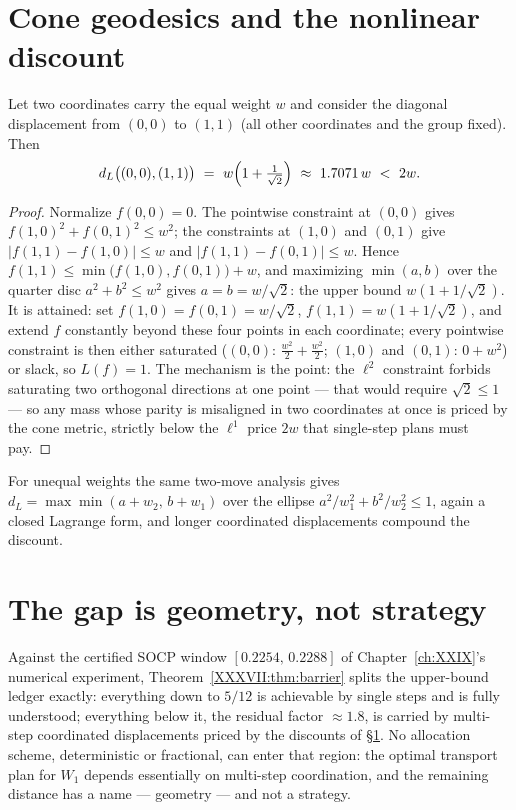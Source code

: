 \section{Cone geodesics and the nonlinear discount}\label{XXXVII:sec:geodesic}

\begin{theorem}\label{XXXVII:thm:diag}
Let two coordinates carry the equal weight $w$ and consider the diagonal displacement
from $(0,0)$ to $(1,1)$ (all other coordinates and the group fixed). Then
\[
d_L\bigl((0,0),(1,1)\bigr)\ =\ w\Bigl(1+\tfrac1{\sqrt2}\Bigr)\ \approx\ 1.7071\,w\ <\ 2w .
\]
\end{theorem}

\begin{proof}
Normalize $f(0,0)=0$. The pointwise constraint at $(0,0)$ gives
$f(1,0)^2+f(0,1)^2\le w^2$; the constraints at $(1,0)$ and $(0,1)$ give
$|f(1,1)-f(1,0)|\le w$ and $|f(1,1)-f(0,1)|\le w$. Hence
$f(1,1)\le\min\bigl(f(1,0),f(0,1)\bigr)+w$, and maximizing $\min(a,b)$ over the quarter
disc $a^2+b^2\le w^2$ gives $a=b=w/\sqrt2$: the upper bound
$w(1+1/\sqrt2)$. It is attained: set $f(1,0)=f(0,1)=w/\sqrt2$,
$f(1,1)=w(1+1/\sqrt2)$, and extend $f$ constantly beyond these four points in each
coordinate; every pointwise constraint is then either saturated
($(0,0)$: $\tfrac{w^2}2+\tfrac{w^2}2$; $(1,0)$ and $(0,1)$: $0+w^2$) or slack, so
$L(f)=1$. The mechanism is the point: the $\ell^2$ constraint forbids saturating two
orthogonal directions at one point --- that would require $\sqrt2\le1$ --- so any mass
whose parity is misaligned in two coordinates at once is priced by the cone metric,
strictly below the $\ell^1$ price $2w$ that single-step plans must pay.
\end{proof}

\begin{remark}
For unequal weights the same two-move analysis gives
$d_L=\max\min(a+w_2,\,b+w_1)$ over the ellipse $a^2/w_1^2+b^2/w_2^2\le1$, again a closed
Lagrange form, and longer coordinated displacements compound the discount.
\end{remark}

\section{The gap is geometry, not strategy}\label{XXXVII:sec:verdict}

Against the certified SOCP window $[0.2254,\,0.2288]$ of Chapter~\ref{ch:XXIX}'s numerical
experiment, Theorem~\ref{XXXVII:thm:barrier} splits the upper-bound ledger exactly: everything
down to $5/12$ is achievable by single steps and is fully understood; everything below
it, the residual factor $\approx1.8$, is carried by multi-step coordinated displacements
priced by the discounts of \S\ref{XXXVII:sec:geodesic}. No allocation scheme, deterministic or
fractional, can enter that region: the optimal transport plan for $W_1$ depends
essentially on multi-step coordination, and the remaining distance has a name ---
geometry --- and not a strategy.

